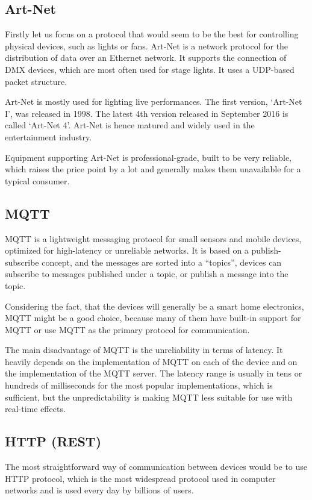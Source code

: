 \hypertarget{x-art-net}{\subsection{Art-Net}}
Firstly let us focus on a protocol that would seem to be the best for controlling
physical devices, such as lights or fans. Art-Net is a network protocol for
the distribution of data over an Ethernet network. It supports the connection of DMX
devices, which are most often used for stage lights. It uses a UDP-based packet
structure.\,\cite{artnet}

Art-Net is mostly used for lighting live performances. The first version,
`Art-Net I', was released in 1998. The latest 4th version released
in September 2016
is called `Art-Net 4'. Art-Net is hence matured and widely used in the
entertainment industry.

Equipment supporting Art-Net is professional-grade, 
built to be very reliable, which raises the price point
by a lot and generally makes them unavailable for a typical consumer.


\hypertarget{x-mqtt}{\subsection{MQTT}}
MQTT is a lightweight messaging protocol for small sensors and mobile devices,
optimized for high-latency or unreliable networks.  It is
based on a publish-subscribe concept, and the messages are sorted into a ``topics'',
devices can subscribe to messages published under a topic, or publish
a message into the topic.\cite{mqtthp}


Considering the fact, that the devices will generally be a smart home
electronics, MQTT might be a good choice, because many of them have built-in
support for MQTT or use MQTT as the primary protocol for communication.


The main disadvantage of MQTT is the unreliability in terms of latency.
It heavily depends on the implementation of MQTT on each of the device and on
the implementation of the MQTT server. The latency range is usually
in tens or hundreds of milliseconds for the most popular implementations,
\cite{mqttlat} which is sufficient, but the unpredictability is making MQTT
less suitable for use with real-time effects.

\pagebreak

\subsection{HTTP (REST)}
The most straightforward way of communication between devices would be to use
HTTP protocol, which is the most widespread protocol used in computer networks
and is used every day by billions of users.\,\cite{httpsrv}


